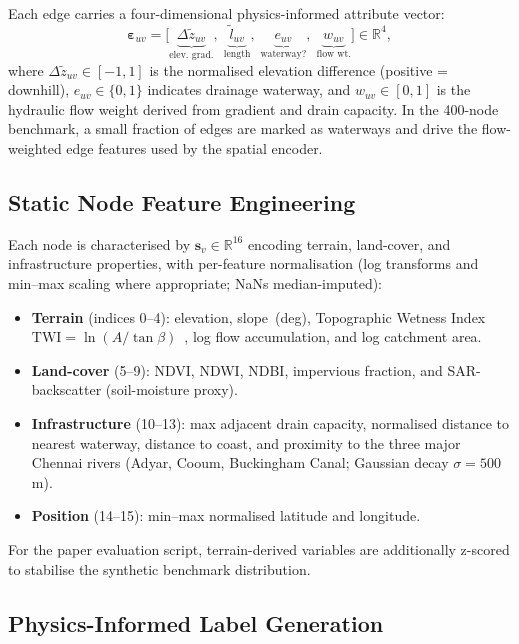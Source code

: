 \documentclass[10pt,twocolumn]{article}
\newcommand{\RR}{\mathbb{R}}
\begin{document}
Each edge carries a four-dimensional physics-informed attribute vector:
\begin{equation}
  \bm{\varepsilon}_{uv} = \bigl[
    \underbrace{\Delta\tilde{z}_{uv}}_{\text{elev.\ grad.}},\;
    \underbrace{\tilde{l}_{uv}}_{\text{length}},\;
    \underbrace{e_{uv}}_{\text{waterway?}},\;
    \underbrace{w_{uv}}_{\text{flow wt.}}
  \bigr] \in \RR^4,
\end{equation}
where $\Delta\tilde{z}_{uv}\in[-1,1]$ is the normalised elevation
difference (positive = downhill), $e_{uv}\in\{0,1\}$ indicates drainage
waterway, and $w_{uv}\in[0,1]$ is the hydraulic flow weight derived from
gradient and drain capacity.
In the 400-node benchmark, a small fraction of edges are marked as
waterways and drive the flow-weighted edge features used by the
spatial encoder.

\subsection{Static Node Feature Engineering}
\label{sec:features}

Each node is characterised by $\bm{s}_v\in\RR^{16}$ encoding terrain,
land-cover, and infrastructure properties, with per-feature normalisation
(log transforms and min--max scaling where appropriate; NaNs median-imputed):
\begin{itemize}[leftmargin=*, itemsep=1pt, topsep=2pt]
  \item \textbf{Terrain} (indices 0--4): elevation, slope~(deg),
    Topographic Wetness Index
    $\mathrm{TWI}{=}\ln(A/\tan\beta)$~\cite{beven1979}, log flow
    accumulation, and log catchment area.
  \item \textbf{Land-cover} (5--9): NDVI, NDWI, NDBI, impervious
    fraction, and SAR-backscatter (soil-moisture proxy).
  \item \textbf{Infrastructure} (10--13): max adjacent drain capacity,
    normalised distance to nearest waterway, distance to coast, and
    proximity to the three major Chennai rivers (Adyar, Cooum,
    Buckingham Canal; Gaussian decay $\sigma{=}500$\,m).
  \item \textbf{Position} (14--15): min--max normalised latitude and longitude.
\end{itemize}
For the paper evaluation script, terrain-derived variables are additionally
z-scored to stabilise the synthetic benchmark distribution.

\subsection{Physics-Informed Label Generation}
\label{sec:labels}
\end{document}
